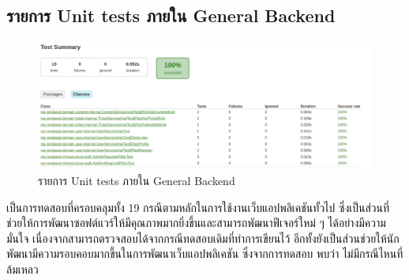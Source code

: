 \documentclass[12pt,oneside,openright,a4paper]{cpe-thai-project}
\begin{document}
      \subsection{รายการ Unit tests ภายใน General Backend} 
        \begin{figure}[!ht]\centering
          \includegraphics[width=\textwidth]{./img/unit_test.png}
          \caption{รายการ Unit tests ภายใน General Backend}\label{fig:unit_test}
        \end{figure}
        \hspace{1cm}เป็นการทดสอบที่ครอบคลุมทั้ง 19 กรณีตามหลักในการใช้งานเว็บแอปพลิเคชันทั้วไป 
        ซึ่งเป็นส่วนที่ช่วยให้การพัฒนาซอฟต์แวร์ให้มีคุณภาพมากยิ่งขึ้นและสามารถพัฒนาฟีเจอร์ใหม่ ๆ ได้อย่างมีความมั่นใจ
        เนื่องจากสามารถตรวจสอบได้จากกรณีทดสอบเดิมที่ทำการเขียนไว้ 
        อีกทั้งยังเป็นส่วนช่วยให้นักพัฒนามีความรอบคอบมากขึ้นในการพัฒนาเว็บแอปพลิเคชัน
        ซึ่งจากการทดสอบ พบว่า ไม่มีกรณีไหนที่ล้มเหลว
      
\end{document}
